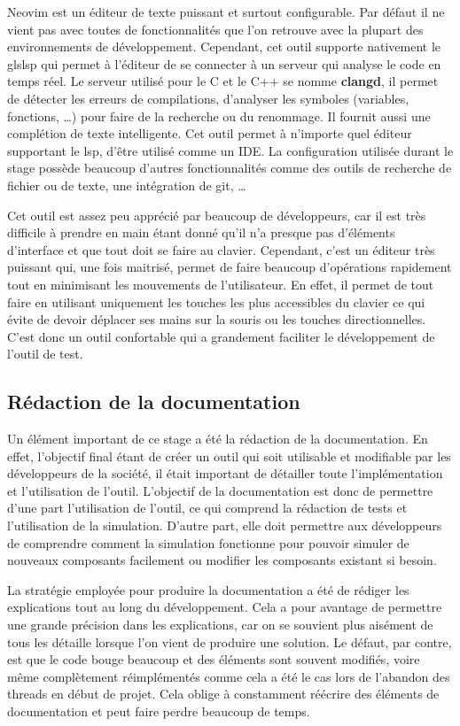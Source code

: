 \documentclass[a4paper]{article}
\begin{document}
Neovim est un éditeur de texte puissant et surtout configurable. Par défaut il
ne vient pas avec toutes de fonctionnalités que l'on retrouve avec la plupart
des environnements de développement. Cependant, cet outil supporte nativement le
gls{lsp} qui permet à l'éditeur de se connecter à un serveur qui analyse le code
en temps réel. Le serveur utilisé pour le C et le C++ se nomme \textbf{clangd},
il permet de détecter les erreurs de compilations, d'analyser les symboles
(variables, fonctions, \dots) pour faire de la recherche ou du renommage. Il
fournit aussi une complétion de texte intelligente. Cet outil permet à n'importe
quel éditeur supportant le \gls{lsp}, d'être utilisé comme un IDE. La
configuration utilisée durant le stage possède beaucoup d'autres fonctionnalités
comme des outils de recherche de fichier ou de texte, une intégration de git,
\dots

Cet outil est assez peu apprécié par beaucoup de développeurs, car il est très
difficile à prendre en main étant donné qu'il n'a presque pas d'éléments
d'interface et que tout doit se faire au clavier. Cependant, c'est un éditeur
très puissant qui, une fois maitrisé, permet de faire beaucoup d'opérations
rapidement tout en minimisant les mouvements de l'utilisateur. En effet, il
permet de tout faire en utilisant uniquement les touches les plus accessibles du
clavier ce qui évite de devoir déplacer ses mains sur la souris ou les touches
directionnelles. C'est donc un outil confortable qui a grandement faciliter le
développement de l'outil de test.
\subsection{Rédaction de la documentation}%

Un élément important de ce stage a été la rédaction de la documentation. En
effet, l'objectif final étant de créer un outil qui soit utilisable et
modifiable par les développeurs de la société, il était important de détailler
toute l'implémentation et l'utilisation de l'outil. L'objectif de la
documentation est donc de permettre d'une part l'utilisation de l'outil, ce qui
comprend la rédaction de tests et l'utilisation de la simulation. D'autre part,
elle doit permettre aux développeurs de comprendre comment la simulation
fonctionne pour pouvoir simuler de nouveaux composants facilement ou modifier
les composants existant si besoin.

La stratégie employée pour produire la documentation a été de rédiger les
explications tout au long du développement. Cela a pour avantage de permettre
une grande précision dans les explications, car on se souvient plus aisément de
tous les détaille lorsque l'on vient de produire une solution. Le défaut, par
contre, est que le code bouge beaucoup et des éléments sont souvent modifiés, voire
même complètement réimplémentés comme cela a été le cas lors de l'abandon des
threads en début de projet. Cela oblige à constamment réécrire des éléments de
documentation et peut faire perdre beaucoup de temps.
\end{document}
